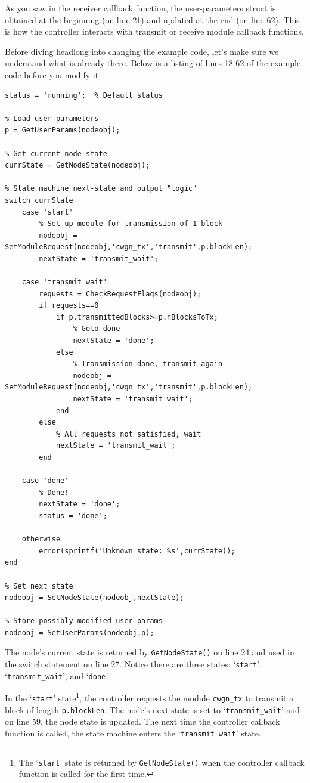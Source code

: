 As you saw in the receiver callback function, the user-parameters struct is obtained at the beginning (on line 21) and updated at the end (on line 62).  This is how the controller interacts with transmit or receive module callback functions.

Before diving headlong into changing the example code, let's make sure we understand what is already there. Below is a listing of lines 18-62 of the example code before you modify it:
%
\begin{lstlisting}[firstnumber=18]
status = 'running';  % Default status

% Load user parameters
p = GetUserParams(nodeobj);

% Get current node state
currState = GetNodeState(nodeobj);

% State machine next-state and output "logic"
switch currState
    case 'start'
        % Set up module for transmission of 1 block
        nodeobj = SetModuleRequest(nodeobj,'cwgn_tx','transmit',p.blockLen);
        nextState = 'transmit_wait';

    case 'transmit_wait'
        requests = CheckRequestFlags(nodeobj);
        if requests==0
            if p.transmittedBlocks>=p.nBlocksToTx;
                % Goto done
                nextState = 'done';
            else
                % Transmission done, transmit again
                nodeobj = SetModuleRequest(nodeobj,'cwgn_tx','transmit',p.blockLen);
                nextState = 'transmit_wait';
            end
        else
            % All requests not satisfied, wait
            nextState = 'transmit_wait';
        end

    case 'done'
        % Done!
        nextState = 'done';
        status = 'done';

    otherwise
        error(sprintf('Unknown state: %s',currState));
end

% Set next state
nodeobj = SetNodeState(nodeobj,nextState);

% Store possibly modified user params
nodeobj = SetUserParams(nodeobj,p);
\end{lstlisting}
%


The node's current state is returned by \verb+GetNodeState()+ on line 24 and used in the switch statement on line 27.  Notice there are three states: `\verb+start+', `\verb+transmit_wait+', and `\verb+done+.'

In the `\verb+start+' state\footnote{The `{\tt start}' state is returned by {\tt GetNodeState()} when the controller callback function is called for the first time.}, the controller requests the module \verb+cwgn_tx+ to transmit a block of length \verb+p.blockLen+. The node's next state is set to `\verb+transmit_wait+' and on line 59, the node state is updated.  The next time the controller callback function is called, the state machine enters the `\verb+transmit_wait+' state.

